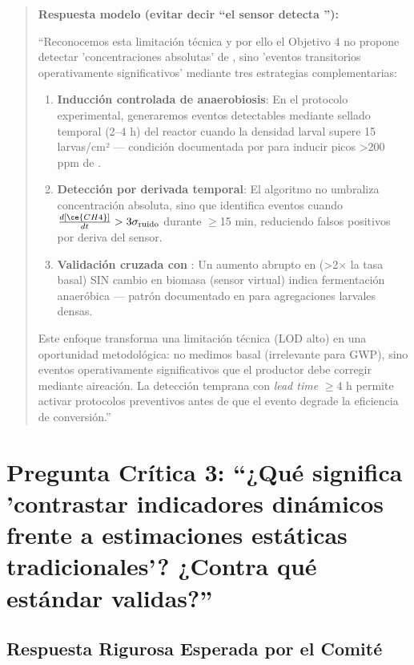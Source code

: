 \documentclass[12pt,oneside]{book}
\begin{document}
\begin{quote}
\textbf{Respuesta modelo (evitar decir ``el sensor detecta ''):}

``Reconocemos esta limitación técnica y por ello el Objetivo 4 no propone detectar 'concentraciones absolutas' de , sino 'eventos transitorios operativamente significativos' mediante tres estrategias complementarias:

\begin{enumerate}
    \item \textbf{Inducción controlada de anaerobiosis}: En el protocolo experimental, generaremos eventos detectables mediante sellado temporal (2--4 h) del reactor cuando la densidad larval supere 15 larvas/cm² --- condición documentada por \textcite{mertenat2019greenhouse} para inducir picos >200 ppm de .
    
    \item \textbf{Detección por derivada temporal}: El algoritmo no umbraliza concentración absoluta, sino que identifica eventos cuando $\frac{d[\ce{CH4}]}{dt} > 3\sigma_{\text{ruido}}$ durante $\geq$15 min, reduciendo falsos positivos por deriva del sensor.
    
    \item \textbf{Validación cruzada con }: Un aumento abrupto en  (>2$\times$ la tasa basal) SIN cambio en biomasa (sensor virtual) indica fermentación anaeróbica --- patrón documentado en \textcite{tomberlin2025bugbook} para agregaciones larvales densas.
\end{enumerate}

Este enfoque transforma una limitación técnica (LOD alto) en una oportunidad metodológica: no medimos  basal (irrelevante para GWP), sino eventos operativamente significativos que el productor debe corregir mediante aireación. La detección temprana con \textit{lead time} $\geq$4 h permite activar protocolos preventivos antes de que el evento degrade la eficiencia de conversión.''
\end{quote}

\section{Pregunta Crítica 3: ``¿Qué significa 'contrastar indicadores dinámicos frente a estimaciones estáticas tradicionales'? ¿Contra qué estándar validas?''}

\subsection{Respuesta Rigurosa Esperada por el Comité}
\end{document}
